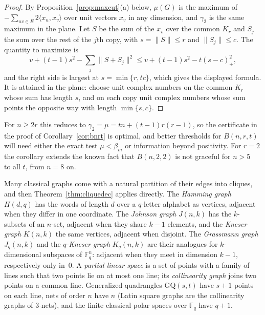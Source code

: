 \documentclass[11pt]{amsart}
\theoremstyle{tplain}
\theoremstyle{tdefinition}
\theoremstyle{tremark}
\begin{document}
\begin{proof}
By Proposition~\ref{prop:maxcut}(a) below, $\mu(G)$ is the maximum of
$-\sum_{uv\in E}2\langle x_u,x_v\rangle$ over unit vectors $x_v$ in any
dimension, and $\gamma_2$ is the same maximum in the plane. Let $S$ be the sum
of the $x_v$ over the common $K_r$ and $S_j$ the sum over the rest of the $j$th
copy, with $s=\|S\|\le r$ and $\|S_j\|\le c$. The quantity to maximize is
\[
 v+(t-1)s^2-\sum_j\|S+S_j\|^2\le v+(t-1)s^2-t(s-c)_+^2,
\]
and the right side is largest at $s=\min\{r,tc\}$, which gives the displayed
formula. It is attained in the plane: choose unit complex numbers on the common $K_r$ whose sum has length $s$,
and on each copy unit complex numbers whose sum points the opposite way
with length $\min\{s,c\}$.
\end{proof}

For $n\ge2r$ this reduces to $\gamma_2=\mu=tn+(t-1)r(r-1)$, so the
certificate in the proof of Corollary~\ref{cor:bnrt} is optimal, and better
thresholds for $B(n,r,t)$ will need either the exact test $\mu<\beta_m$ or
information beyond positivity. For
$r=2$ the corollary extends the known fact that $B(n,2,2)$ is not graceful for
$n>5$~\cite{bf,gallian} to all $t$, from $n=8$ on.

Many classical graphs come with a natural partition of their edges into
cliques, and then Theorem~\ref{thm:cliquedec} applies directly. The \emph{Hamming graph} $H(d,q)$ has the words of length
$d$ over a $q$-letter alphabet as vertices, adjacent when they differ in one
coordinate. The \emph{Johnson graph} $J(n,k)$ has the $k$-subsets of an
$n$-set, adjacent when they share $k-1$ elements, and the \emph{Kneser graph}
$K(n,k)$ the same vertices, adjacent when disjoint. The \emph{Grassmann graph}
$J_q(n,k)$ and the \emph{$q$-Kneser graph} $K_q(n,k)$ are their analogues for
$k$-dimensional subspaces of $\mathbb F_q^n$: adjacent when they meet in
dimension $k-1$, respectively only in~$0$. A \emph{partial linear space} is a
set of points with a family of lines such that two points lie on at most one
line; its \emph{collinearity graph} joins two points on a common line.
Generalized quadrangles $\mathrm{GQ}(s,t)$ have $s+1$ points on each line,
nets of order $n$ have $n$ (Latin square graphs are the collinearity graphs of
$3$-nets), and the finite classical polar spaces over $\mathbb F_q$ have
$q+1$.
\end{document}
